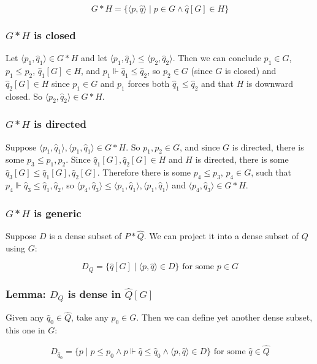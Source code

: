 \documentclass[12pt]{article}
\begin{document}
$$G*H=\{\langle p,\hat{q}\rangle\mid p\in G \wedge \hat{q}[G]\in H\}$$

\subsubsection*{$G*H$ is closed}

Let $\langle p_1,\hat{q}_1\rangle\in G*H$ and let $\langle p_1,\hat{q}_1\rangle\leq\langle p_2,\hat{q}_2\rangle$.  Then we can conclude $p_1\in G$, $p_1\leq p_2$, $\hat{q}_1[G]\in H$, and $p_1\Vdash \hat{q}_1\leq\hat{q}_2$, so $p_2\in G$ (since $G$ is closed) and $\hat{q}_2[G]\in H$ since $p_1\in G$ and $p_1$ forces both $\hat{q}_1\leq\hat{q}_2$ and that $H$ is downward closed.  So $\langle p_2,\hat{q}_2\rangle\in G*H$.

\subsubsection*{$G*H$ is directed}

Suppose $\langle p_1,\hat{q}_1\rangle,\langle p_1,\hat{q}_1\rangle\in G*H$.  So $p_1,p_2\in G$, and since $G$ is directed, there is some $p_3\leq p_1,p_2$.  Since $\hat{q}_1[G],\hat{q}_2[G]\in H$ and $H$ is directed, there is some $\hat{q}_3[G]\leq\hat{q}_1[G],\hat{q}_2[G]$.  Therefore there is some $p_4\leq p_3$, $p_4\in G$, such that $p_4\Vdash \hat{q}_3\leq \hat{q}_1,\hat{q}_2$, so $\langle p_4,\hat{q}_3\rangle\leq\langle p_1,\hat{q}_1\rangle,\langle p_1,\hat{q}_1\rangle$ and $\langle p_4,\hat{q}_3\rangle\in G*H$.

\subsubsection*{$G*H$ is generic}

Suppose $D$ is a dense subset of $P*\hat{Q}$.  We can project it into a dense subset of $Q$ using $G$:

$$D_Q=\{\hat{q}[G]\mid \langle p,\hat{q}\rangle\in D\} \text{ for some }p\in G$$

\subsubsection*{Lemma: $D_Q$ is dense in $\hat{Q}[G]$}
Given any $\hat{q}_0\in \hat{Q}$, take any $p_0\in G$.  Then we can define yet another dense subset, this one in $G$:

$$D_{\hat{q}_0}=\{p\mid p\leq p_0 \wedge p\Vdash \hat{q}\leq \hat{q}_0 \wedge \langle p,\hat{q}\rangle\in D\} \text{ for some }\hat{q}\in\hat{Q}$$
\end{document}
